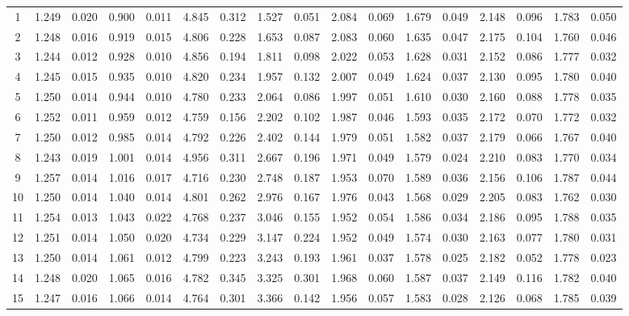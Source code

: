 \documentclass{article}
\begin{document}
\begin{table}[H]
{\begin{tabular}{|c|c|c|c|c|c|c|c|c|c|c|c|c|c|c|c|c|}
     1 & 1.249 & 0.020 & 0.900 & 0.011 & 4.845 & 0.312 & 1.527 & 0.051 & 2.084 & 0.069 & 1.679 & 0.049 & 2.148 & 0.096 & 1.783 & 0.050 \\ 
     2 & 1.248 & 0.016 & 0.919 & 0.015 & 4.806 & 0.228 & 1.653 & 0.087 & 2.083 & 0.060 & 1.635 & 0.047 & 2.175 & 0.104 & 1.760 & 0.046 \\ 
     3 & 1.244 & 0.012 & 0.928 & 0.010 & 4.856 & 0.194 & 1.811 & 0.098 & 2.022 & 0.053 & 1.628 & 0.031 & 2.152 & 0.086 & 1.777 & 0.032 \\ 
     4 & 1.245 & 0.015 & 0.935 & 0.010 & 4.820 & 0.234 & 1.957 & 0.132 & 2.007 & 0.049 & 1.624 & 0.037 & 2.130 & 0.095 & 1.780 & 0.040 \\ 
     5 & 1.250 & 0.014 & 0.944 & 0.010 & 4.780 & 0.233 & 2.064 & 0.086 & 1.997 & 0.051 & 1.610 & 0.030 & 2.160 & 0.088 & 1.778 & 0.035 \\ 
     6 & 1.252 & 0.011 & 0.959 & 0.012 & 4.759 & 0.156 & 2.202 & 0.102 & 1.987 & 0.046 & 1.593 & 0.035 & 2.172 & 0.070 & 1.772 & 0.032 \\ 
     7 & 1.250 & 0.012 & 0.985 & 0.014 & 4.792 & 0.226 & 2.402 & 0.144 & 1.979 & 0.051 & 1.582 & 0.037 & 2.179 & 0.066 & 1.767 & 0.040 \\ 
     8 & 1.243 & 0.019 & 1.001 & 0.014 & 4.956 & 0.311 & 2.667 & 0.196 & 1.971 & 0.049 & 1.579 & 0.024 & 2.210 & 0.083 & 1.770 & 0.034 \\ 
     9 & 1.257 & 0.014 & 1.016 & 0.017 & 4.716 & 0.230 & 2.748 & 0.187 & 1.953 & 0.070 & 1.589 & 0.036 & 2.156 & 0.106 & 1.787 & 0.044 \\ 
    10 & 1.250 & 0.014 & 1.040 & 0.014 & 4.801 & 0.262 & 2.976 & 0.167 & 1.976 & 0.043 & 1.568 & 0.029 & 2.205 & 0.083 & 1.762 & 0.030 \\ 
    11 & 1.254 & 0.013 & 1.043 & 0.022 & 4.768 & 0.237 & 3.046 & 0.155 & 1.952 & 0.054 & 1.586 & 0.034 & 2.186 & 0.095 & 1.788 & 0.035 \\ 
    12 & 1.251 & 0.014 & 1.050 & 0.020 & 4.734 & 0.229 & 3.147 & 0.224 & 1.952 & 0.049 & 1.574 & 0.030 & 2.163 & 0.077 & 1.780 & 0.031 \\ 
    13 & 1.250 & 0.014 & 1.061 & 0.012 & 4.799 & 0.223 & 3.243 & 0.193 & 1.961 & 0.037 & 1.578 & 0.025 & 2.182 & 0.052 & 1.778 & 0.023 \\ 
    14 & 1.248 & 0.020 & 1.065 & 0.016 & 4.782 & 0.345 & 3.325 & 0.301 & 1.968 & 0.060 & 1.587 & 0.037 & 2.149 & 0.116 & 1.782 & 0.040 \\ 
    15 & 1.247 & 0.016 & 1.066 & 0.014 & 4.764 & 0.301 & 3.366 & 0.142 & 1.956 & 0.057 & 1.583 & 0.028 & 2.126 & 0.068 & 1.785 & 0.039 \\ 

\end{tabular}}
\end{table}
\end{document}
